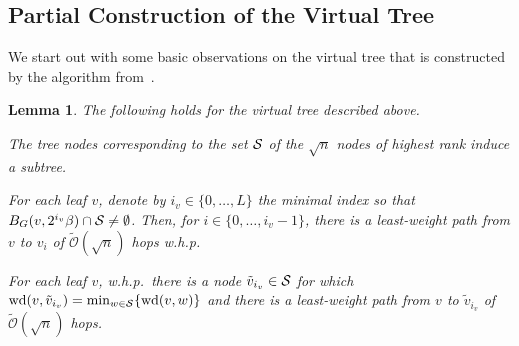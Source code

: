 \documentclass[letterpaper,11pt]{article}
\newtheorem{lemma}[theorem]{Lemma}
\newcommand{\BO}{\mathcal{O}}
\DeclareMathOperator{\Wd}{wd}
\begin{document}
\subsection{Partial Construction of the Virtual Tree}\label{sec:partial}
We start out with some basic observations on the virtual tree that is
constructed by the algorithm from~\cite{KKMPT-12}.
\begin{lemma}\label{lemma:stage1_tree_s}
The following holds for the virtual tree described above.
\begin{compactenum}
\item The tree nodes corresponding to the set ${\cal S}$ of the $\sqrt{n}$ nodes
of highest rank induce a subtree.
\item For each leaf $v$, denote by $i_v\in \{0,\ldots,L\}$ the
minimal index so that $B_G(v,2^{i_v}\beta)\cap {\cal S}\neq \emptyset$. Then,
for $i\in \{0,\ldots,i_v-1\}$, there is a least-weight path from $v$ to $v_i$ of
$\tilde{\BO}(\sqrt{n})$ hops w.h.p.
\item For each leaf $v$, w.h.p.\ there is a node
$\tilde{v}_{i_v}\in {\cal S}$ for which $\Wd(v,\tilde{v}_{i_v})=\min_{w\in {\cal
S}}\{\Wd(v,w)\}$ and there is a least-weight path from $v$ to $\tilde{v}_{i_v}$
of $\tilde{\BO}(\sqrt{n})$ hops.
\end{compactenum}
\end{lemma}
\end{document}
